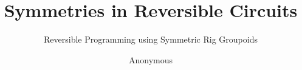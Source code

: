 \documentclass[acmsmall,review,anonymous]{acmart}
\begin{document}

\title{Symmetries in Reversible Circuits}
\subtitle{Reversible Programming using Symmetric Rig Groupoids}






\author{Anonymous}

\renewcommand{\shortauthors}{Anonymous}

\end{document}

